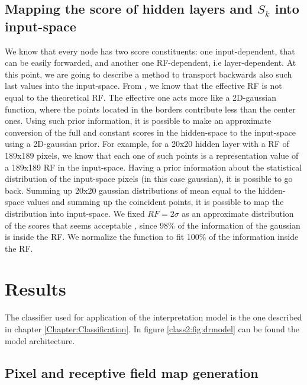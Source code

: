 \subsection{Mapping the score of hidden layers and $S_k$ into input-space} \label{score:sec:mapping-input}

We know that every node has two score constituents: one input-dependent, that can be easily forwarded, and another one RF-dependent, i.e layer-dependent. At this point, we are going to describe a method to transport backwards also such last values into the input-space. From \citep{luo2016understanding}, we know that the effective RF is not equal to the theoretical RF. The effective one acts more like a 2D-gaussian function, where the points located in the borders contribute less than the center ones. Using such prior information, it is possible to make an approximate conversion of the full and constant scores in the hidden-space to the input-space using a 2D-gaussian prior. For example, for a 20x20 hidden layer with a RF of 189x189 pixels, we know that each one of such points is a representation value of a 189x189 RF in the input-space. Having a prior information about the statistical distribution of the input-space pixels (in this case gaussian), it is possible to go back. Summing up 20x20 gaussian distributions of mean equal to the hidden-space values and summing up the coincident points, it is possible to map the distribution into input-space. We fixed $RF = 2\sigma$ as an approximate distribution of the scores that seems acceptable \citep{luo2016understanding}, since 98\% of the information of the gaussian is inside the RF. We normalize the function to fit 100\% of the information inside the RF.


\section{Results}\label{score:sec:results}

The classifier used for application of the interpretation model is the one described in chapter \ref{Chapter:Classification}. In figure \ref{class2:fig:drmodel} can be found the model architecture.

\subsection{Pixel and receptive field map generation}

